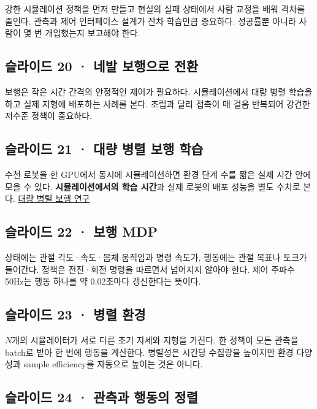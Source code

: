 \documentclass[11pt,a4paper]{article}
\begin{document}
강한 시뮬레이션 정책을 먼저 만들고 현실의 실패 상태에서 사람 교정을 배워 격차를 줄인다. 관측과 제어 인터페이스 설계가 잔차 학습만큼 중요하다. 성공률뿐 아니라 사람이 몇 번 개입했는지 보고해야 한다.\par

\subsection{슬라이드 20 · 네발 보행으로 전환}

보행은 작은 시간 간격의 안정적인 제어가 필요하다. 시뮬레이션에서 대량 병렬 학습을 하고 실제 지형에 배포하는 사례를 본다. 조립과 달리 접촉이 매 걸음 반복되어 강건한 저수준 정책이 중요하다.\par

\subsection{슬라이드 21 · 대량 병렬 보행 학습}

수천 로봇을 한 GPU에서 동시에 시뮬레이션하면 환경 단계 수를 짧은 실제 시간 안에 모을 수 있다. \textbf{시뮬레이션에서의 학습 시간}과 실제 로봇의 배포 성능을 별도 수치로 본다. \href{https://arxiv.org/abs/2109.11978}{대량 병렬 보행 연구}\par

\subsection{슬라이드 22 · 보행 MDP}

상태에는 관절 각도·속도·몸체 움직임과 명령 속도가, 행동에는 관절 목표나 토크가 들어간다. 정책은 전진·회전 명령을 따르면서 넘어지지 않아야 한다. 제어 주파수 50Hz는 행동 하나를 약 0.02초마다 갱신한다는 뜻이다.\par

\subsection{슬라이드 23 · 병렬 환경}

$N$개의 시뮬레이터가 서로 다른 초기 자세와 지형을 가진다. 한 정책이 모든 관측을 batch로 받아 한 번에 행동을 계산한다. 병렬성은 시간당 수집량을 높이지만 환경 다양성과 sample efficiency를 자동으로 높이는 것은 아니다.\par

\subsection{슬라이드 24 · 관측과 행동의 정렬}
\end{document}
